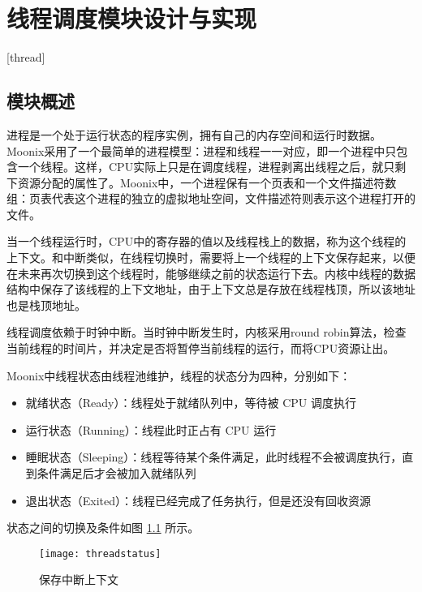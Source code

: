 
\chapter{线程调度模块设计与实现}[thread]
\label{chapter:thread}

\section{模块概述}

进程是一个处于运行状态的程序实例，拥有自己的内存空间和运行时数据。Moonix采用了一个最简单的进程模型：进程和线程一一对应，即一个进程中只包含一个线程。这样，CPU实际上只是在调度线程，进程剥离出线程之后，就只剩下资源分配的属性了。Moonix中，一个进程保有一个页表和一个文件描述符数组：页表代表这个进程的独立的虚拟地址空间，文件描述符则表示这个进程打开的文件。

当一个线程运行时，CPU中的寄存器的值以及线程栈上的数据，称为这个线程的上下文。和中断类似，在线程切换时，需要将上一个线程的上下文保存起来，以便在未来再次切换到这个线程时，能够继续之前的状态运行下去。内核中线程的数据结构中保存了该线程的上下文地址，由于上下文总是存放在线程栈顶，所以该地址也是栈顶地址。

线程调度依赖于时钟中断。当时钟中断发生时，内核采用round robin算法\cite{DBLP:journals/eor/RasmussenT08}，检查当前线程的时间片，并决定是否将暂停当前线程的运行，而将CPU资源让出。

Moonix中线程状态由线程池维护，线程的状态分为四种，分别如下：

\begin{itemize}
	\item 就绪状态（Ready）：线程处于就绪队列中，等待被 CPU 调度执行
	\item 运行状态（Running）：线程此时正占有 CPU 运行
	\item 睡眠状态（Sleeping）：线程等待某个条件满足，此时线程不会被调度执行，直到条件满足后才会被加入就绪队列
	\item 退出状态（Exited）：线程已经完成了任务执行，但是还没有回收资源
\end{itemize}

状态之间的切换及条件如图 \ref{pic:threadstatus} 所示。

\begin{figure}[htpb]
	\centering
	\texttt{[image: threadstatus]}
	\setlength{\abovecaptionskip}{2pt}
	\caption{保存中断上下文}
	\label{pic:threadstatus}
\end{figure}

